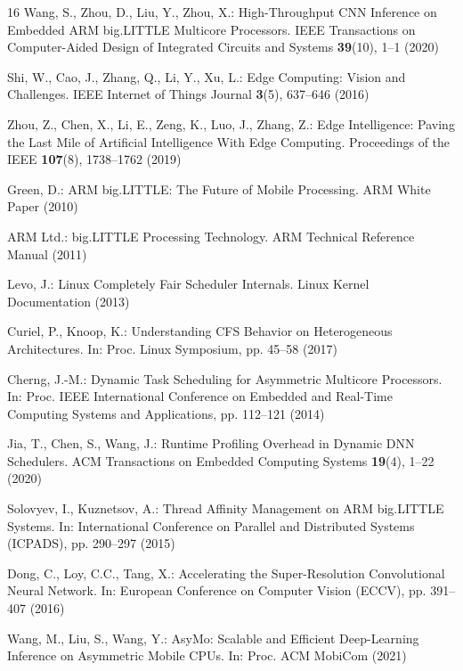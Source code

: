 \documentclass[runningheads]{llncs}
\begin{document}
\begin{thebibliography}{16}
Wang, S., Zhou, D., Liu, Y., Zhou, X.: High-Throughput CNN Inference on Embedded ARM big.LITTLE Multicore Processors. IEEE Transactions on Computer-Aided Design of Integrated Circuits and Systems \textbf{39}(10), 1--1 (2020)

Shi, W., Cao, J., Zhang, Q., Li, Y., Xu, L.: Edge Computing: Vision and Challenges. IEEE Internet of Things Journal \textbf{3}(5), 637--646 (2016)

Zhou, Z., Chen, X., Li, E., Zeng, K., Luo, J., Zhang, Z.: Edge Intelligence: Paving the Last Mile of Artificial Intelligence With Edge Computing. Proceedings of the IEEE \textbf{107}(8), 1738--1762 (2019)

Green, D.: ARM big.LITTLE: The Future of Mobile Processing. ARM White Paper (2010)

ARM Ltd.: big.LITTLE Processing Technology. ARM Technical Reference Manual (2011)

Levo, J.: Linux Completely Fair Scheduler Internals. Linux Kernel Documentation (2013)

Curiel, P., Knoop, K.: Understanding CFS Behavior on Heterogeneous Architectures. In: Proc. Linux Symposium, pp. 45--58 (2017)

Cherng, J.-M.: Dynamic Task Scheduling for Asymmetric Multicore Processors. In: Proc. IEEE International Conference on Embedded and Real-Time Computing Systems and Applications, pp. 112--121 (2014)

Jia, T., Chen, S., Wang, J.: Runtime Profiling Overhead in Dynamic DNN Schedulers. ACM Transactions on Embedded Computing Systems \textbf{19}(4), 1--22 (2020)

Solovyev, I., Kuznetsov, A.: Thread Affinity Management on ARM big.LITTLE Systems. In: International Conference on Parallel and Distributed Systems (ICPADS), pp. 290--297 (2015)

Dong, C., Loy, C.C., Tang, X.: Accelerating the Super-Resolution Convolutional Neural Network. In: European Conference on Computer Vision (ECCV), pp. 391--407 (2016)

Wang, M., Liu, S., Wang, Y.: AsyMo: Scalable and Efficient Deep-Learning Inference on Asymmetric Mobile CPUs. In: Proc. ACM MobiCom (2021)


\end{thebibliography}
\end{document}
